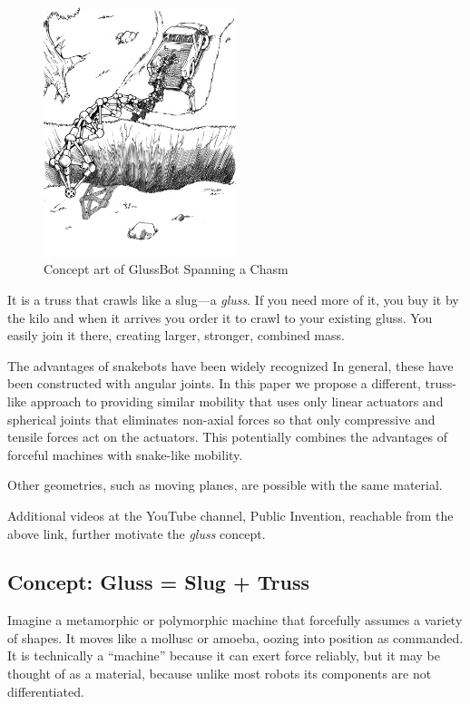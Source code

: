 \documentclass[11pt]{article}
\begin{document}
\begin{figure}[H]
  \centering
    \includegraphics[width=0.5\textwidth]{figures/robotTruckChasm.png}
    \caption[Concept art of GlussBot Spanning a Chasm]{Concept art of GlussBot Spanning a Chasm}
      \label{chasmspan}
\end{figure}

It is a truss that crawls like a slug---a \emph{gluss}.
If you need more of it, you buy it by the kilo and when it arrives you order it
to crawl to your existing gluss. You easily join it there, creating
larger, stronger, combined mass.

The advantages of snakebots have been widely recognized %
In general, these have been constructed
with angular joints. In this paper we propose a different, truss-like approach to providing similar
mobility that uses only linear actuators and spherical joints that eliminates non-axial forces so that only
compressive and tensile forces act on the actuators.
This potentially combines the advantages of forceful machines with snake-like mobility.


Other geometries, such as moving planes, are possible with the same material.

Additional videos at the YouTube channel, Public Invention, reachable from the above link,
further motivate the \emph{gluss} concept.

\subsection{Concept: Gluss = Slug + Truss}

Imagine a metamorphic or polymorphic machine that forcefully assumes a variety of shapes. It moves like a mollusc or amoeba,
oozing into position as commanded. It is technically a ``machine'' because it can exert force reliably, but
it may be thought of as a material, because unlike most robots its components are not differentiated.
\end{document}
